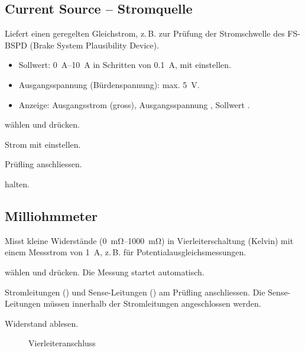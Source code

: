 \subsection{Current Source -- Stromquelle}
\label{sec:mode_isrc}
Liefert einen geregelten Gleichstrom, z.\,B. zur Prüfung der Stromschwelle des \ac{FS}-BSPD
(Brake System Plausibility Device).
\begin{itemize}
    \item Sollwert: \qtyrange{0}{10}{\ampere} in Schritten von \qty{0.1}{\ampere}, mit \enc{} einstellen.
    \item Ausgangsspannung (Bürdenspannung): max. \qty{5}{\volt}.
    \item Anzeige: Ausgangsstrom (gross), Ausgangsspannung , Sollwert .
\end{itemize}
\begin{steps}
    \item {} wählen und  drücken.
    \item Strom mit \enc{} einstellen.
    \item Prüfling anschliessen.
    \item {} halten.
\end{steps}

\subsection{Milliohmmeter}
\label{sec:mode_mohm}
Misst kleine Widerstände (\qtyrange{0}{1000}{\milli\ohm}) in Vierleiterschaltung (Kelvin) mit
einem Messstrom von \qty{1}{\ampere}, z.\,B. für Potentialausgleichsmessungen.
\begin{steps}
    \item {} wählen und  drücken. Die Messung startet automatisch.
    \item Stromleitungen () und Sense-Leitungen () am Prüfling
          anschliessen. Die Sense-Leitungen müssen innerhalb der Stromleitungen angeschlossen werden.
    \item Widerstand ablesen.
\end{steps}
\begin{figure}[h!]
    \centering
    \caption{Vierleiteranschluss}
\end{figure}

